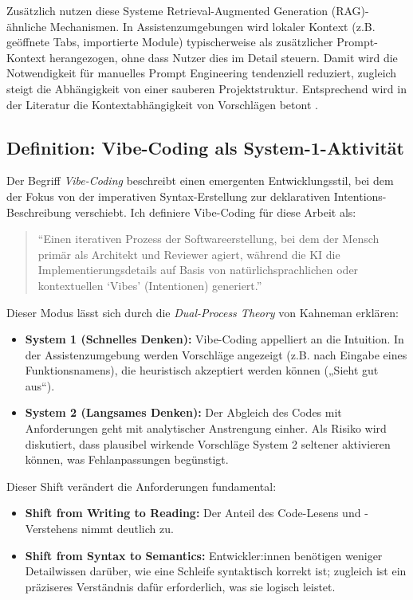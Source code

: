 Zusätzlich nutzen diese Systeme Retrieval-Augmented Generation (RAG)-ähnliche Mechanismen.
In Assistenzumgebungen wird lokaler Kontext (z.B. geöffnete Tabs, importierte Module) typischerweise als zusätzlicher Prompt-Kontext herangezogen, ohne dass Nutzer dies im Detail steuern.
Damit wird die Notwendigkeit für manuelles Prompt Engineering tendenziell reduziert, zugleich steigt die Abhängigkeit von einer sauberen Projektstruktur.
Entsprechend wird in der Literatur die Kontextabhängigkeit von Vorschlägen betont \parencite{witte2023context}.

\subsection{Definition: Vibe-Coding als System-1-Aktivität}
Der Begriff \emph{Vibe-Coding} beschreibt einen emergenten Entwicklungsstil, bei dem der Fokus von der imperativen Syntax-Erstellung zur deklarativen Intentions-Beschreibung verschiebt. Ich definiere Vibe-Coding für diese Arbeit als:
\begin{quote}
    \enquote{Einen iterativen Prozess der Softwareerstellung, bei dem der Mensch primär als Architekt und Reviewer agiert, während die KI die Implementierungsdetails auf Basis von natürlichsprachlichen oder kontextuellen \enquote{Vibes} (Intentionen) generiert.}
\end{quote}

Dieser Modus lässt sich durch die \emph{Dual-Process Theory} von Kahneman \parencite{kahneman2011thinking} erklären:
\begin{itemize}
    \item  \textbf{System 1 (Schnelles Denken):} Vibe-Coding appelliert an die Intuition. In der Assistenzumgebung werden Vorschläge angezeigt (z.B. nach Eingabe eines Funktionsnamens), die heuristisch akzeptiert werden können („Sieht gut aus“).
    \item  \textbf{System 2 (Langsames Denken):} Der Abgleich des Codes mit Anforderungen geht mit analytischer Anstrengung einher. Als Risiko wird diskutiert, dass plausibel wirkende Vorschläge System 2 seltener aktivieren können, was Fehlanpassungen begünstigt.
\end{itemize}

Dieser Shift verändert die Anforderungen fundamental:
\begin{itemize}
    \item  \textbf{Shift from Writing to Reading:} Der Anteil des Code-Lesens und -Verstehens nimmt deutlich zu.
    \item  \textbf{Shift from Syntax to Semantics:} Entwickler:innen benötigen weniger Detailwissen darüber, wie eine Schleife syntaktisch korrekt ist; zugleich ist ein präziseres Verständnis dafür erforderlich, was sie logisch leistet.
\end{itemize}

